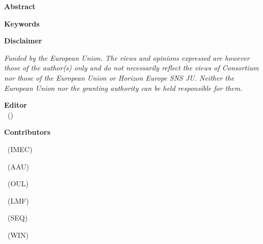 {\textbf{Abstract}}\\
\vspace{0.1cm}
\Abstract

\vspace{1cm}
{\textbf{Keywords}}\\
\vspace{0.1cm}
\keyword


\vfill
{\textbf{Disclaimer}}
\vspace{0.1cm}

\textit{\small Funded by the European Union. The views and opinions expressed are however those of the author(s) only and do not necessarily reflect the views of \projectname Consortium nor those of the European Union or Horizon Europe SNS JU. Neither the European Union nor the granting authority can be held responsible for them. }
\vspace{0.1cm}
\clearpage



\textbf{Editor}\\

\vspace*{0.1cm}
\Editor\ (\EditorsOrg)\\
\vspace*{1cm}


\textbf{Contributors}\\
\vspace*{0.1cm}


\ifdefined\authorlistIMEC
    \colonlist\authorlistIMEC
    ~(IMEC)
\else
\fi

\ifdefined\authorlistAAU
    \colonlist\authorlistAAU
    ~(AAU)
\else
\fi

\ifdefined\authorlistOUL
    \colonlist\authorlistOUL
    ~(OUL)
\else
\fi

\ifdefined\authorlistLMF
    \colonlist\authorlistLMF
    ~(LMF)
\else
\fi

\ifdefined\authorlistSEQ
    \colonlist\authorlistSEQ
    ~(SEQ)
\else
\fi

\ifdefined\authorlistWIN
    \colonlist\authorlistWIN
    ~(WIN)
\else
\fi

